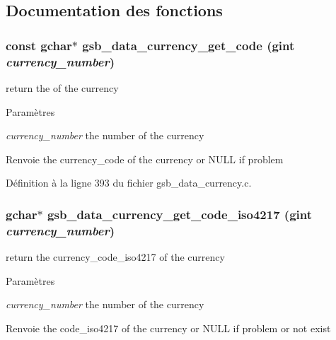 \subsection{Documentation des fonctions}
\subsubsection[{gsb\_\-data\_\-currency\_\-get\_\-code}]{\setlength{\rightskip}{0pt plus 5cm}const gchar$\ast$ gsb\_\-data\_\-currency\_\-get\_\-code (gint {\em currency\_\-number})}\label{gsb__data__currency_8h_a6f9afd2f990b4e988a468c868f4371a4}
return the of the currency


\begin{DoxyParams}{Paramètres}
\item[{\em currency\_\-number}]the number of the currency\end{DoxyParams}
\begin{DoxyReturn}{Renvoie}
the currency\_\-code of the currency or NULL if problem 
\end{DoxyReturn}


Définition à la ligne 393 du fichier gsb\_\-data\_\-currency.c.

\subsubsection[{gsb\_\-data\_\-currency\_\-get\_\-code\_\-iso4217}]{\setlength{\rightskip}{0pt plus 5cm}gchar$\ast$ gsb\_\-data\_\-currency\_\-get\_\-code\_\-iso4217 (gint {\em currency\_\-number})}\label{gsb__data__currency_8h_a2ad6d2ddf40f2a9da62e9a4f9252b869}
return the currency\_\-code\_\-iso4217 of the currency


\begin{DoxyParams}{Paramètres}
\item[{\em currency\_\-number}]the number of the currency\end{DoxyParams}
\begin{DoxyReturn}{Renvoie}
the code\_\-iso4217 of the currency or NULL if problem or not exist 
\end{DoxyReturn}


